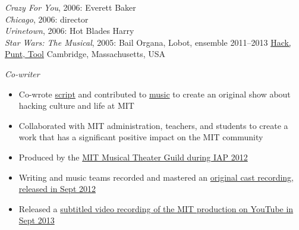 \documentclass[]{friggeri-cv}
\begin{document}
\begin{entrylist}
{	\emph{Crazy For You}, 2006: Everett Baker\\
	\emph{Chicago}, 2006: director\\
	\emph{Urinetown}, 2006: Hot Blades Harry\\
	\emph{Star Wars: The Musical}, 2005: Bail Organa, Lobot, ensemble
	}
  \entry
	{2011--2013}
	{\href{http://hackpunttool.com/}{Hack, Punt, Tool}}
	{Cambridge, Massachusetts, USA}
	{\emph{Co-writer}
	\begin{itemize}
		\item Co-wrote \href{http://hackpunttool.files.wordpress.com/2012/03/hptfinalscript.pdf}{script} and contributed to \href{http://hackpunttool.files.wordpress.com/2012/03/hpt-pc-score-2-16-12.pdf}{music} to create an original show about hacking culture and life at MIT
		\item Collaborated with MIT administration, teachers, and students to create a work that has a significant positive impact on the MIT community
		\item Produced by the \href{http://web.mit.edu/mtg/www/2012/IAP/ProdStaff.html}{MIT Musical Theater Guild during IAP 2012}
		\item Writing and music teams recorded and mastered an \href{http://hackpunttool.bandcamp.com/}{original cast recording, released in Sept 2012}
		\item Released a \href{https://www.youtube.com/playlist?list=PLEUCiGVkvGkd9ZECCR2aLecWmMHvccJtI}{subtitled video recording of the MIT production on YouTube in Sept 2013}
	\end{itemize}
	}
\end{entrylist}

\newpage
\end{document}
